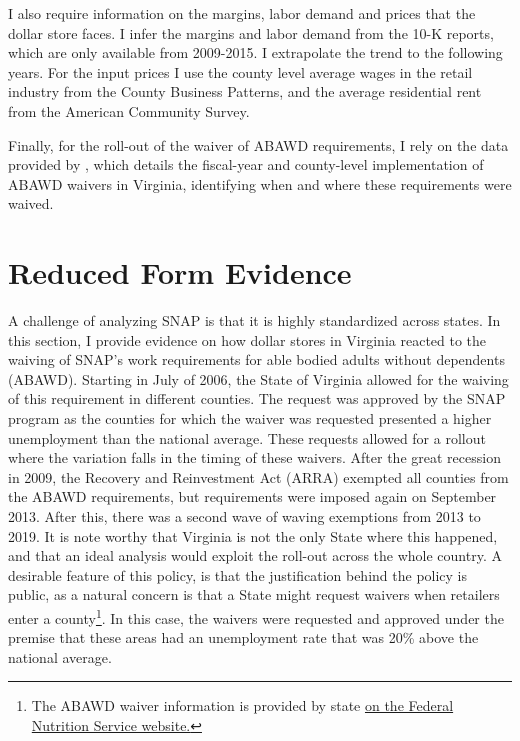\documentclass[11.5pt]{article}
\begin{document}
I also require information on the margins, labor demand and prices that the dollar store faces. I infer the margins and labor demand from the 10-K reports, which are only available from 2009-2015. I extrapolate the trend to the following years. For the input prices I use the county level average wages in the retail industry from the County Business Patterns, and the average residential rent from the American Community Survey. 

Finally, for the roll-out of the waiver of ABAWD requirements, I rely on the data provided by \citeauthor{gray2023employed} \citeyear{gray2023employed}, which details the fiscal-year and county-level implementation of ABAWD waivers in Virginia, identifying when and where these requirements were waived.



\section{Reduced Form Evidence}

A challenge of analyzing SNAP is that it is highly standardized across states. In this section, I provide evidence on how dollar stores in Virginia reacted to the waiving of SNAP's work requirements for able bodied adults without dependents (ABAWD). Starting in July of 2006, the State of Virginia allowed for the waiving of this requirement in different counties. The request was approved by the SNAP program as the counties for which the waiver was requested presented a higher unemployment than the national average. These requests allowed for a rollout where the variation falls in the timing of these waivers. After the great recession in 2009, the Recovery and Reinvestment Act (ARRA) exempted all counties from the ABAWD requirements, but requirements were imposed again on September 2013. After this, there was a second wave of waving exemptions from 2013 to 2019. It is note worthy that Virginia is not the only State where this happened, and that an ideal analysis would exploit the roll-out across the whole country. A desirable feature of this policy, is that the justification behind the policy is public, as a natural concern is that a State might request waivers when retailers enter a county\footnote{The ABAWD waiver information is provided by state \href{https://www.fns.usda.gov/snap/abawd/waivers}{on the Federal Nutrition Service website.}}. In this case, the waivers were requested and approved under the premise that these areas had an unemployment rate that was 20\% above the national average. 
\end{document}
